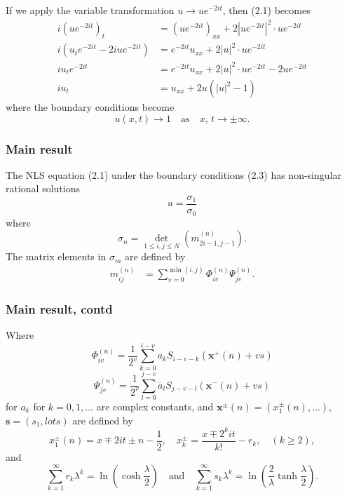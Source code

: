 \documentclass{beamer}
\def\e{\end}
\theoremstyle{plain}
\theoremstyle{definition}
\begin{document}
\frame
{
If we apply the variable transformation $u\rightarrow ue^{-2it}$, then (2.1) becomes
\begin{equation*}\tag{2.2}
\begin{aligned}
i(ue^{-2it})_t&=(ue^{-2it})_{xx}+2\left|ue^{-2it}\right|^2\cdot ue^{-2it}\\
i\left(u_te^{-2it}-2iue^{-2it}\right)&=e^{-2it}u_{xx}+2|u|^2\cdot ue^{-2it}\\
iu_te^{-2it}&=e^{-2it}u_{xx}+2|u|^2\cdot ue^{-2it}-2ue^{-2it}\\
iu_t&=u_{xx}+2u\left(|u|^2-1\right)
\e{aligned}
\e{equation*}
where the boundary conditions become
\begin{equation*}\tag{2.3}
u(x,t)\rightarrow 1\quad\text{as}\quad x,\,t\rightarrow\pm\infty.
\e{equation*}
}



\frame
{
\frametitle{Main result}
The NLS equation (2.1) under the boundary conditions (2.3) has non-singular rational solutions
\begin{equation*}
u=\dfrac{\sigma_1}{\sigma_0}
\e{equation*}
where
\begin{equation*}
\sigma_n=\det_{1\le i,j\le N}\left(m^{(n)}_{2i-1,j-1}\right).
\e{equation*}
The matrix elements in $\sigma_m$ are defined by
\begin{equation*}
\begin{aligned}
m_{ij}^{(n)}&=\sum_{v=0}^{\min(i,j)}\Phi_{iv}^{(n)}\Psi_{jv}^{(n)} .
\e{aligned}
\e{equation*}
}

\frame
{
\frametitle{Main result, contd}
Where
\begin{equation*}
\Phi_{iv}^{(n)}=\dfrac{1}{2^v}\sum^{i-v}_{k=0}a_kS_{i-v-k}\left(\boldsymbol x^{+}(n)+vs\right)\end{equation*}
\begin{equation*}
\Psi_{jv}^{(n)}=\dfrac{1}{2^v}\sum^{j-v}_{l=0}\overline{a}_lS_{j-v-l}\left(\boldsymbol x^{-}(n)+vs\right)
\e{equation*}
for $a_k$ for $k=0,1,\ldots$ are complex constants, and $\boldsymbol x^{\pm}(n)=(x_1^{\pm}(n),\ldots)$, $\boldsymbol s=(s_1,lots)$ are defined by 
\begin{equation*}\tag{2.4}
x_1^{\pm}(n)=x\mp2it\pm n-\dfrac{1}{2},\quad x_k^{\pm}=\dfrac{x\mp2^kit}{k!}-r_k, \quad(k\ge2),
\e{equation*}
and
\begin{equation*}
\sum^{\infty}_{k=1}r_k\lambda^k=\ln\left(\cosh\dfrac{\lambda}{2}\right)\quad\text{and}\quad\sum^{\infty}_{k=1}s_k\lambda^k=\ln\left(\dfrac{2}{\lambda}\tanh\dfrac{\lambda}{2}\right).
\e{equation*}
}
\end{document}
